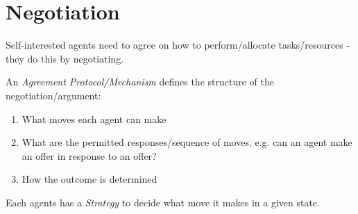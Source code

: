 \section{Negotiation}
Self-interested agents need to agree on how to perform/allocate tasks/resources - they do this by negotiating.

An \emph{Agreement Protocol/Mechanism} defines the structure of the negotiation/argument:
\begin{enumerate}
    \item What moves each agent can make
    \item What are the permitted responses/sequence of moves. e.g. can an agent make an offer in response to an offer?
    \item How the outcome is determined
\end{enumerate}
Each agents has a \emph{Strategy} to decide what move it makes in a given state. 

